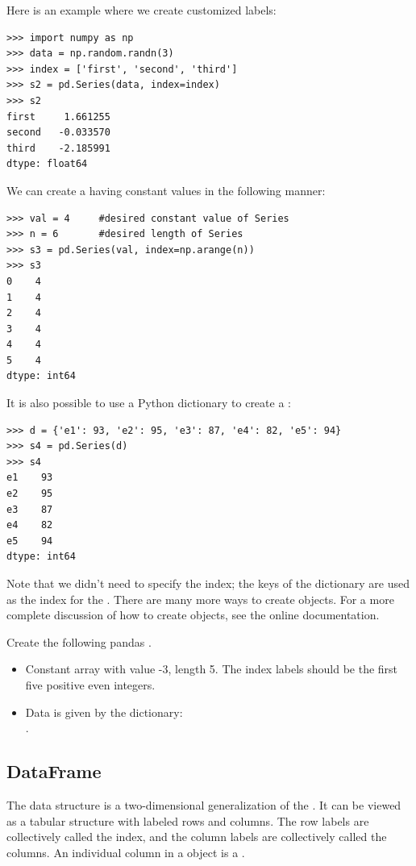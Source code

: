 Here is an example where we create customized labels:
\begin{lstlisting}
>>> import numpy as np
>>> data = np.random.randn(3)
>>> index = ['first', 'second', 'third']
>>> s2 = pd.Series(data, index=index)
>>> s2
first     1.661255
second   -0.033570
third    -2.185991
dtype: float64
\end{lstlisting}

We can create a  having constant values in the following manner:
\begin{lstlisting}
>>> val = 4     #desired constant value of Series
>>> n = 6       #desired length of Series
>>> s3 = pd.Series(val, index=np.arange(n))
>>> s3
0    4
1    4
2    4
3    4
4    4
5    4
dtype: int64
\end{lstlisting}

It is also possible to use a Python dictionary to create a :
\begin{lstlisting}
>>> d = {'e1': 93, 'e2': 95, 'e3': 87, 'e4': 82, 'e5': 94}
>>> s4 = pd.Series(d)
>>> s4
e1    93
e2    95
e3    87
e4    82
e5    94
dtype: int64
\end{lstlisting}
Note that we didn't need to specify the index; the keys of the dictionary
are used as the index for the . There are many more ways to create
 objects. For a more complete discussion of how to create 
objects, see the online documentation.

\begin{problem}
Create the following pandas .

\begin{itemize}
\item Constant array with value -3, length 5. The index labels should be the
first five positive even integers.

\item Data is given by the dictionary: \\
.
\end{itemize}
\end{problem}

\subsection*{DataFrame}
The  data structure is a two-dimensional generalization of the . It can be viewed
as a tabular structure with labeled rows and columns. The row labels are collectively called the
index, and the column labels are collectively called the columns. An individual column in a
 object is a .

